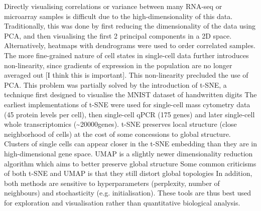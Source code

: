 Directly visualising correlations or variance between many RNA-seq or microarray samples is difficult due to the high-dimensionality of this data. Traditionally, this was done by first reducing the dimensionality of the data using PCA, and then visualising the first 2 principal components in a 2D space. Alternatively, heatmaps with dendrograms were used to order correlated samples. The more fine-grained nature of cell states in single-cell data further introduces non-linearity, since gradients of expression in the population are no longer averaged out [I think this is important]. This non-linearity precluded the use of PCA. This problem was partially solved by the introduction of t-SNE, a technique first designed to visualise the MNIST dataset of handwritten digits The earliest implementations of t-SNE were used for single-cell mass cytometry data (45 protein levels per cell), then single-cell qPCR (175 genes) and later single-cell whole transcriptomics (\textasciitilde{\num{20000}}genes). t-SNE preserves local structure (close neighborhood of cells) at the cost of some concessions to global structure. Clusters of single cells can appear closer in the t-SNE embedding than they are in high-dimensional gene space. UMAP is a slightly newer dimensionality reduction algorithm which aims to better preserve global structure Some common criticisms of both t-SNE and UMAP is that they still distort global topologies In addition, both methods are sensitive to hyperparameters (perplexity, number of neighbours) and stochasticity (e.g. initialisation). These tools are thus best used for exploration and visualisation rather than quantitative biological analysis.

